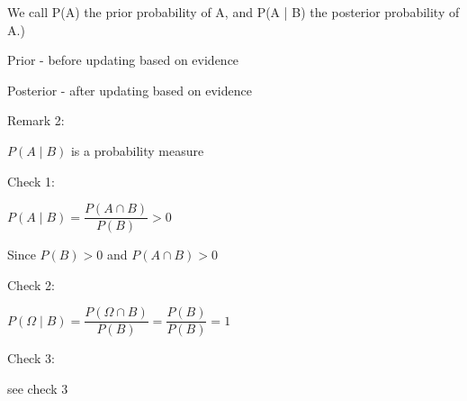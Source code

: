\documentclass[12 pt]{article}
\begin{document}
			We call P(A) the prior probability of A, and P(A | B) the posterior probability of A.)
			
			Prior - before updating based on evidence
			
			Posterior - after updating based on evidence
			
			Remark 2:
			
			$P(A \mid B)$ is a probability measure
			
			Check 1:
			
			$P(A \mid B) = \dfrac{P(A \cap B)}{P(B)} > 0$
			
			Since $P(B) > 0$ and $P(A \cap B) > 0$
			
			Check 2:
			
			$P(\Omega \mid B) = \dfrac{P(\Omega \cap B)}{P(B)} = \dfrac{P(B)}{P(B)} = 1$
			
			Check 3:
			
			see check 3
	
\end{document}
